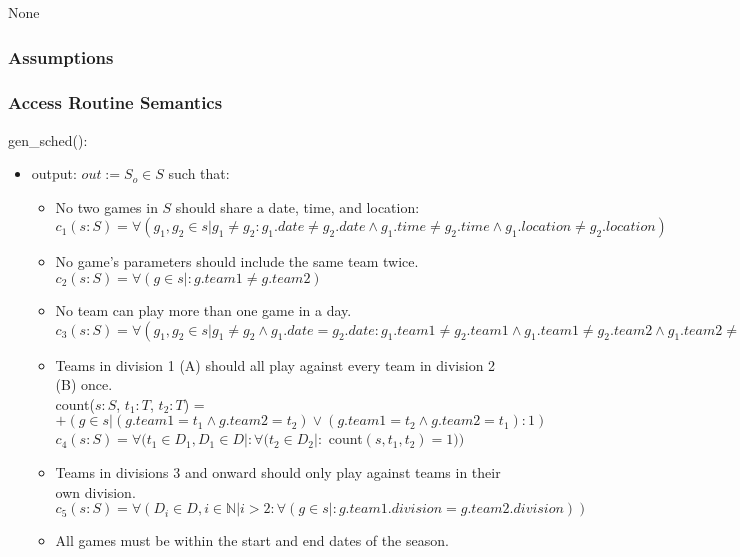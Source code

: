 \documentclass[12pt, titlepage]{article}
\begin{document}
None

\subsubsection{Assumptions}


\subsubsection{Access Routine Semantics}

\noindent gen\_sched():
\begin{itemize}
\item output: $out := S_o \in S$ such that:
\begin{itemize}
  \item No two games in $S$ should share a date, time, and location:\\
  $c_1(s:S) = \forall(g_1, g_2 \in s | g_1 \neq g_2 : g_1.date \neq
  g_2.date \land g_1.time \neq g_2.time \land g_1.location \neq g_2.location)$
  \item No game's parameters should include the same team twice.\\
  $c_2(s:S) = \forall (g \in s |: g.team1 \neq g.team2)$
  \item No team can play more than one game in a day.\\
  $c_3(s:S) = \forall (g_1, g_2 \in s |g_1 \neq g_2 \land g_1.date =
  g_2.date : g_1.team1 \neq g_2.team1 \land g_1.team1 \neq g_2.team2 \land
  g_1.team2 \neq g_2.team1 \land g_1.team2 \neq g_2.team2)$
  \item Teams in division 1 (A) should all play against every team in division
  2 (B) once.\\
  count($s:S$, $t_1:T$, $t_2:T$) = $+(g \in s | (g.team1 = t_1 \land
  g.team2 = t_2) \lor (g.team1 = t_2 \land g.team2 = t_1) : 1)$\\
  $c_4(s:S) = \forall (t_1 \in D_1, D_1 \in D |: \forall (t_2 \in D_2 |:$ count$(s, t_1,
  t_2) = 1))$
  \item Teams in divisions 3 and onward should only play against teams in
  their own division.\\
  $c_5(s:S) = \forall (D_i \in D, i \in \mathbb{N} | i > 2 : \forall (g \in s |:
  g.team1.division = g.team2.division))$
  \item All games must be within the start and end dates of the season.\\

\end{itemize}
\end{itemize}
\end{document}
